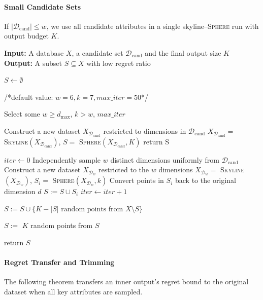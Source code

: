 \paragraph{\textbf{Small Candidate Sets}}
If $\lvert\mathcal{D}_\text{cand}\rvert\leq w$, we use all candidate attributes in a single skyline--\textsc{Sphere} run with output budget $K$.

\begin{algorithm}[!t]
\caption{\textsc{AttributeSubset}}
\label{alg:att}
\flushleft
\textbf{Input:} A database $X$, a candidate set $\mathcal{D}_\text{cand}$ and the final output size $K$ \\
\textbf{Output:} A subset $S\subseteq X$ with low regret ratio

\begin{algorithmic}[1]

\State $S \gets \emptyset$

\Statex /*default value: $w=6, k = 7, max\_iter = 50$*/

\State Select some $w \geq d_\text{max}$, $k>w$, $max\_iter$ 

    \State Construct a new dataset $X_{\mathcal{D}_\text{cand}}$ restricted to dimensions in $\mathcal{D}_\text{cand}$
    \State $X_{\mathcal{D}_\text{cand}} = $ \textsc{Skyline}$(X_{\mathcal{D}_\text{cand}})$, $S = $ \textsc{Sphere}$(X_{\mathcal{D}_\text{cand}}, K)$
    \State return S
\EndIf

\State $iter \gets 0$
    \State Independently sample $w$ distinct dimensions uniformly from $\mathcal{D}_\text{cand}$
    \State Construct a new dataset $X_{\mathcal{D}_w}$ restricted to the $w$ dimensions
    \State $X_{\mathcal{D}_w} = $ \textsc{Skyline}$(X_{\mathcal{D}_w})$, $S_i = $ \textsc{Sphere}$(X_{\mathcal{D}_w}, k)$
    \State Convert points in $S_i$ back to the original dimension $d$
    \State $S := S \cup S_i$
    \State $iter \gets iter+1$
\EndWhile

    \State $S := S \cup \{\text{$K-|S|$ random points from $X\setminus S$} \}$
\EndIf

    \State $S := $ $K$ random points from $S$
\EndIf

\State return $S$
\end{algorithmic}
\end{algorithm}

\paragraph{\textbf{Regret Transfer and Trimming}}
The following theorem transfers an inner output's regret bound to the original dataset when all key attributes are sampled.

